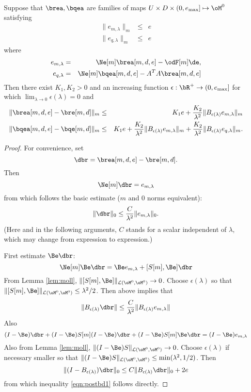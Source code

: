 \begin{thm} \label{thm:innerbd} Suppose that $\brea,\bqea$ are families of maps $U \times
  D \times (0,e_{\rm max}] \mapsto \oM^0$ satisfying
\begin{eqnarray}
\label{eqn:priorbd1}
\|e_{m,\lambda}\|_m & \le & e\\
\label{eqn:priorbd2}
\|e_{q,\lambda}\|_m &\le& e 
\end{eqnarray}
where
\begin{eqnarray}
\label{eqn:mres}
e_{m,\lambda} & = & \Ne[m]\brea[m,d,e]-\odF[m]\de,\\
\label{eqn:qres}
e_{q,\lambda} & = & \Ne[m]\bqea[m,d,e]-A^TA\brea[m,d,e] 
\end{eqnarray}
Then there exist $K_1,K_2 > 0$ and an increasing function $\epsilon: \bR^+
\rightarrow (0,e_{\rm max}]$ for which $\lim_{\lambda \rightarrow 0}
\epsilon(\lambda)=0$ and
\begin{eqnarray}
\label{eqn:postbd1}
\|\brea[m,d,e] -\bre[m,d]\|_m & \le & K_1e + \frac{K_2}{\lambda^2}
                                      \|B_{\epsilon(\lambda)}e_{m,\lambda}\|_m\\
\label{eqn:postbd2}
\|\bqea[m,d,e] -\bqe[m,d]\|_m & \le & K_1e + \frac{K_2}{\lambda^2}
\|B_{\epsilon(\lambda)}e_{m,\lambda}\|_m + \frac{K_2}{\lambda^2} \|B_{\epsilon(\lambda)}e_{q,\lambda}\|_m.
\end{eqnarray}
\end{thm}

\begin{proof} For convenience, set
\[
\dbr = \brea[m,d,e] -\bre[m,d].
\]
Then
\[
\Ne[m] \dbr = e_{m,\lambda}
\]
from which follows the basic estimate ($m$ and $0$ norms equivalent):
\[
\|\dbr\|_0 \le \frac{C}{\lambda^2}\| e_{m,\lambda}\|_0.
\]
(Here and in the following arguments, $C$ stands for a scalar
independent of $\lambda$, which may change from expression to
expression.)

First estimate $\Be \dbr$:
\[
\Ne[m] \Be \dbr = \Be e_{m,\lambda} + [S[m],\Be]\dbr
\]
From Lemma \ref{lem:moll}, $\|[S[m],\Be]\|_{{\cal L}(\oM^0,\oM^0)} \rightarrow
  0$. Choose $\epsilon(\lambda)$ so that $\|[S[m],\Be]\|_{{\cal
      L}(\oM^0,\oM^0)} \le \lambda^2/2$. Then above implies that
\[
\|B_{\epsilon(\lambda)} \dbr\| \le \frac{C}{\lambda^2}
\|B_{\epsilon(\lambda)} e_{m,\lambda}\|
\]
Also
\[
(I-\Be)\dbr + (I-\Be)S[m](I-\Be)\dbr + (I-\Be)S[m]\Be\dbr =
(I-\Be)e_{m,\lambda}
\]
Also from Lemma \ref{lem:moll}, $\|(I-\Be)S\|_{{\cal L}(\oM^0,\oM^0)} \rightarrow
  0$. Choose $\epsilon(\lambda)$ if necessary smaller so that $\|(I-\Be)S\|_{{\cal
      L}(\oM^0,\oM^0)} \le \min(\lambda^2,1/2)$. Then
\[
\|(I-B_{\epsilon(\lambda)})\dbr\|_0 \le
C\|B_{\epsilon(\lambda)} \dbr\|_0 + 2e
\]
from which inequality \ref{eqn:postbd1} follows directly.

\end{proof}
